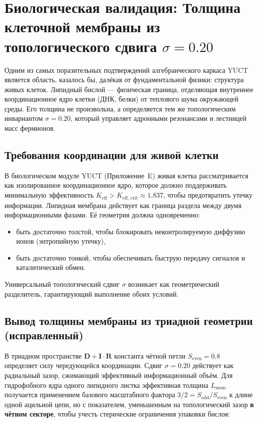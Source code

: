 \documentclass[12pt,a4paper]{article}
\begin{document}
	\section*{Биологическая валидация: Толщина клеточной мембраны из топологического сдвига \(\sigma = 0.20\)}
	\label{sec:membrane}
	
	Одним из самых поразительных подтверждений алгебраического каркаса YUCT является область, казалось бы, далёкая от фундаментальной физики: структура живых клеток. Липидный бислой — физическая граница, отделяющая внутреннее координационное ядро клетки (ДНК, белки) от теплового шума окружающей среды. Его толщина не произвольна, а определяется тем же топологическим инвариантом \(\sigma = 0.20\), который управляет адронными резонансами и лестницей масс фермионов.
	
	\subsection*{Требования координации для живой клетки}
	
	В биологическом модуле YUCT (Приложение~E) живая клетка рассматривается как изолированное координационное ядро, которое должно поддерживать минимальную эффективность \(K_{\mathrm{eff}} > K_{\mathrm{eff,\,crit}} \approx 1.837\), чтобы предотвратить утечку информации. Липидная мембрана действует как граница раздела между двумя информационными фазами. Её геометрия должна одновременно:
	\begin{itemize}
		\item быть достаточно толстой, чтобы блокировать неконтролируемую диффузию ионов (энтропийную утечку),
		\item быть достаточно тонкой, чтобы обеспечивать быструю передачу сигналов и каталитический обмен.
	\end{itemize}
	Универсальный топологический сдвиг \(\sigma\) возникает как геометрический разделитель, гарантирующий выполнение обоих условий.
	
	\subsection*{Вывод толщины мембраны из триадной геометрии (исправленный)}
	
	В триадном пространстве \(\mathbf{D} + \mathbf{I}\!\cdot\!\mathbf{R}\) константа чётной петли \(S_{\mathrm{even}} = 0.8\) определяет силу чередующейся координации. Сдвиг \(\sigma = 0.20\) действует как радиальный зазор, сжимающий эффективный информационный объём. Для гидрофобного ядра одного липидного листка эффективная толщина \(L_{\mathrm{mem}}\) получается применением базового масштабного фактора \(3/2 = S_{\mathrm{odd}}/S_{\mathrm{even}}\) к длине одной ацильной цепи, но с показателем, уменьшенным на топологический зазор \textbf{в чётном секторе}, чтобы учесть стерические ограничения упаковки бислоя:
	
\end{document}

